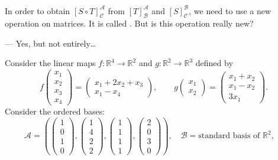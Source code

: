 In order to obtain $[S \circ T]_{\mathcal{C}}^{\mathcal{A}}$ from $[T]_{\mathcal{B}}^{\mathcal{A}}$ and $[S]_{\mathcal{C}}^{\mathcal{B}}$, we need to use a new operation on matrices. It is called . But is this operation really new?

\medskip
\noindent--- Yes, but not entirely\dots

\begin{exercise}
\label{exc:change_of_bases_composition}
Consider the linear maps $f \colon \mathbb{R}^4 \to \mathbb{R}^2$ and $g \colon \mathbb{R}^2 \to \mathbb{R}^3$ defined by
\[
f\begin{pmatrix} x_1 \\ x_2 \\ x_3 \\ x_4 \end{pmatrix} = \begin{pmatrix} x_1 + 2x_2 + x_3 \\ x_1 - x_4 \end{pmatrix}, \qquad
g\begin{pmatrix} x_1 \\ x_2 \end{pmatrix} = \begin{pmatrix} x_1 + x_2 \\ x_1 - x_2 \\ 3x_1 \end{pmatrix}.
\]
Consider the ordered bases:
\[
\mathcal{A} = \left( \begin{pmatrix} 1 \\ 0 \\ 1 \\ 0 \end{pmatrix}, \begin{pmatrix} 1 \\ 4 \\ 2 \\ 2 \end{pmatrix}, \begin{pmatrix} 1 \\ 1 \\ 1 \\ 1 \end{pmatrix}, \begin{pmatrix} 2 \\ 0 \\ 3 \\ 0 \end{pmatrix} \right), \quad
\mathcal{B} = \text{standard basis of } \mathbb{R}^2, \quad
\]
\end{exercise}
